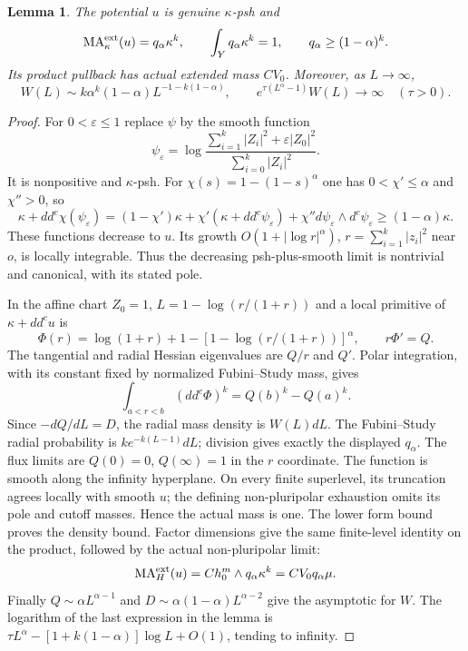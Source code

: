 \documentclass[11pt]{article}
\newcommand{\ddc}{dd^c}
\newcommand{\dc}{d^c}
\newcommand{\MA}{\operatorname{MA}}
\newtheorem{lemma}[theorem]{Lemma}
\theoremstyle{remark}\newtheorem{remark}[theorem]{Remark}
\begin{document}
\begin{lemma}\label{lem:barrier}
The potential $u$ is genuine $\kappa$-psh and
\[
 \MA_\kappa^{\rm ext}(u)=q_\alpha\kappa^k,\qquad
 \int_Yq_\alpha\kappa^k=1,\qquad q_\alpha\geq(1-\alpha)^k.
\]
Its product pullback has actual extended mass $CV_0$. Moreover,
as $L\to\infty$,
\[
 W(L)\sim k\alpha^k(1-\alpha)L^{-1-k(1-\alpha)},\qquad
 e^{\tau(L^\alpha-1)}W(L)\longrightarrow\infty\quad(\tau>0).
\]
\end{lemma}
\begin{proof}
For $0<\varepsilon\leq1$ replace $\psi$ by the smooth function
\[
 \psi_\varepsilon=
 \log\frac{\sum_{i=1}^k|Z_i|^2+\varepsilon|Z_0|^2}
               {\sum_{i=0}^k|Z_i|^2}.
\]
It is nonpositive and $\kappa$-psh. For
$\chi(s)=1-(1-s)^\alpha$ one has $0<\chi'\leq\alpha$ and
$\chi''>0$, so
\[
 \kappa+\ddc\chi(\psi_\varepsilon)
 =(1-\chi')\kappa+\chi'(\kappa+\ddc\psi_\varepsilon)
   +\chi''d\psi_\varepsilon\wedge\dc\psi_\varepsilon
 \geq(1-\alpha)\kappa.
\]
These functions decrease to $u$. Its growth
$O(1+|\log r|^\alpha)$, $r=\sum_{i=1}^k|z_i|^2$ near $o$,
is locally integrable. Thus the decreasing psh-plus-smooth limit is
nontrivial and canonical, with its stated pole.

In the affine chart $Z_0=1$, $L=1-\log(r/(1+r))$ and a local
primitive of $\kappa+\ddc u$ is
\[
 \Phi(r)=\log(1+r)+1-[1-\log(r/(1+r))]^\alpha,
 \qquad r\Phi'=Q.
\]
The tangential and radial Hessian eigenvalues are $Q/r$ and $Q'$.
Polar integration, with its constant fixed by normalized
Fubini--Study mass, gives
\[
 \int_{a<r<b}(\ddc\Phi)^k=Q(b)^k-Q(a)^k.
\]
Since $-dQ/dL=D$, the radial mass density is $W(L)dL$.
The Fubini--Study radial probability is $ke^{-k(L-1)}dL$;
division gives exactly the displayed $q_\alpha$.
The flux limits are $Q(0)=0$, $Q(\infty)=1$ in the $r$ coordinate.
The function is smooth along the infinity hyperplane. On every
finite superlevel, its truncation agrees locally with smooth $u$;
the defining non-pluripolar exhaustion omits its pole and cutoff
masses. Hence the actual mass is one. The lower form bound proves
the density bound. Factor dimensions give the same finite-level
identity on the product, followed by the actual non-pluripolar limit:
\[
 \MA_H^{\rm ext}(u)=C h_0^m\wedge q_\alpha\kappa^k=CV_0q_\alpha\mu.
\]
Finally $Q\sim\alpha L^{\alpha-1}$ and
$D\sim\alpha(1-\alpha)L^{\alpha-2}$ give the asymptotic for $W$.
The logarithm of the last expression in the lemma is
$\tau L^\alpha-[1+k(1-\alpha)]\log L+O(1)$, tending to infinity.
\end{proof}
\end{document}
